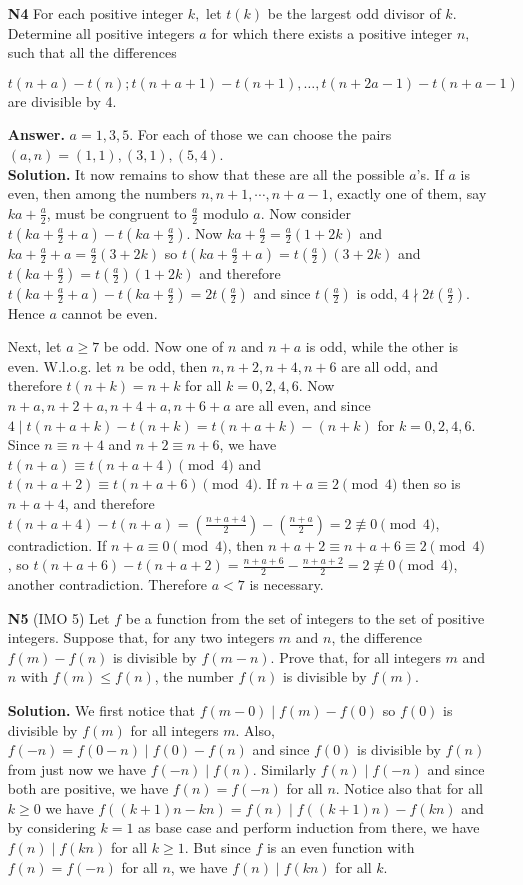 \documentclass[11pt,a4paper]{article}
\begin{document}
\begin{enumerate}
	\item[\textbf{N4}] For each positive integer $k,$ let $t(k)$ be the largest odd divisor of $k.$ Determine all positive integers $a$ for which there exists a positive integer $n,$ such that all the differences
	
	\[t(n+a)-t(n); t(n+a+1)-t(n+1), \ldots, t(n+2a-1)-t(n+a-1)\] are divisible by 4.
	
	\textbf{Answer.} $a=1, 3, 5$. For each of those we can choose the pairs $(a, n)=(1, 1), (3, 1), (5,4)$. \\
	\textbf{Solution.} It now remains to show that these are all the possible $a$'s. If $a$ is even, then among the numbers $n, n+1, \cdots , n+a-1$, exactly one of them, say $ka+\frac{a}{2}$, must be congruent to $\frac{a}{2}$ modulo $a$. Now consider $t(ka+\frac{a}{2}+a)-t(ka+\frac{a}{2})$. 
	Now $ka+\frac{a}{2}=\frac{a}{2}(1+2k)$ and $ka+\frac{a}{2}+a=\frac{a}{2}(3+2k)$ so $t(ka+\frac{a}{2}+a)=t(\frac{a}{2})(3+2k)$ and $t(ka+\frac{a}{2})=t(\frac{a}{2})(1+2k)$ and therefore 
	$t(ka+\frac{a}{2}+a)-t(ka+\frac{a}{2})=2t(\frac{a}{2})$ and since $t(\frac{a}{2})$ is odd, $4\nmid 2t(\frac{a}{2})$. Hence $a$ cannot be even. 
	
	Next, let $a\ge 7$ be odd. Now one of $n$ and $n+a$ is odd, while the other is even. W.l.o.g. let $n$ be odd, then $n, n+2, n+4, n+6$ are all odd, and therefore $t(n+k)=n+k$ for all $k=0, 2, 4, 6$. 
	Now $n+a, n+2+a, n+4+a, n+6+a$ are all even, and since $4\mid t(n+a+k)-t(n+k)=t(n+a+k)-(n+k)$ for $k=0, 2, 4, 6$. Since $n\equiv n+4$ and $n+2\equiv n+6$, we have $t(n+a)\equiv t(n+a+4)\pmod{4}$ and $t(n+a+2)\equiv t(n+a+6)\pmod{4}$. If $n+a\equiv 2\pmod{4}$ then so is $n+a+4$, and therefore $t(n+a+4)-t(n+a)=(\frac{n+a+4}{2})-(\frac{n+a}{2})=2\not\equiv 0\pmod{4}$, contradiction. 
	If $n+a\equiv 0\pmod{4}$, then $n+a+2\equiv n+a+6\equiv 2\pmod{4}$, so $t(n+a+6)-t(n+a+2)=\frac{n+a+6}{2}-\frac{n+a+2}{2}=2\not\equiv 0\pmod{4}$, another contradiction. Therefore $a<7$ is necessary. 
	
	\item[\textbf{N5}] (IMO 5) Let $f$ be a function from the set of integers to the set of positive integers. Suppose that, for any two integers $m$ and $n$, the difference $f(m) - f(n)$ is divisible by $f(m- n)$. Prove that, for all integers $m$ and $n$ with $f(m) \leq f(n)$, the number $f(n)$ is divisible by $f(m)$.
	
	\textbf{Solution.} We first notice that $f(m-0)\mid f(m)-f(0)$ so $f(0)$ is divisible by $f(m)$ for all integers $m$. Also, $f(-n)=f(0-n)\mid f(0)-f(n)$ and since $f(0)$ is divisible by $f(n)$ from just now we have $f(-n)\mid f(n)$. Similarly $f(n)\mid f(-n)$ and since both are positive, we have $f(n)=f(-n)$ for all $n$. Notice also that for all $k\ge 0$ we have $f((k+1)n - kn) = f(n)\mid f((k+1)n) - f(kn)$ and by considering $k=1$ as base case and perform induction from there, we have $f(n)\mid f(kn)$ for all $k\ge 1$. But since $f$ is an even function with $f(n)=f(-n)$ for all $n$, we have $f(n)\mid f(kn)$ for all $k$. 
	

\end{enumerate}
\end{document}
